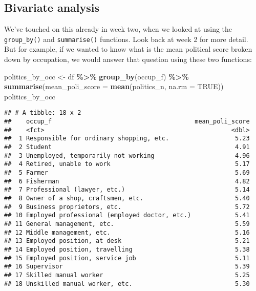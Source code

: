 \documentclass[
]{book}
\newenvironment{Shaded}{\begin{snugshade}}{\end{snugshade}}
\newcommand{\AttributeTok}[1]{\textcolor[rgb]{0.13,0.29,0.53}{#1}}
\newcommand{\ConstantTok}[1]{\textcolor[rgb]{0.56,0.35,0.01}{#1}}
\newcommand{\FunctionTok}[1]{\textcolor[rgb]{0.13,0.29,0.53}{\textbf{#1}}}
\newcommand{\NormalTok}[1]{#1}
\newcommand{\OtherTok}[1]{\textcolor[rgb]{0.56,0.35,0.01}{#1}}
\newcommand{\SpecialCharTok}[1]{\textcolor[rgb]{0.81,0.36,0.00}{\textbf{#1}}}
\begin{document}
\subsection{Bivariate analysis}\label{bivariate-analysis}

We've touched on this already in week two, when we looked at using the \texttt{group\_by()} and \texttt{summarise()} functions. Look back at week 2 for more detail. But for example, if we wanted to know what is the mean political score broken down by occupation, we would answer that question using these two functions:

\begin{Shaded}
\begin{Highlighting}[]
\NormalTok{politics\_by\_occ }\OtherTok{\textless{}{-}}\NormalTok{ df }\SpecialCharTok{\%\textgreater{}\%} 
    \FunctionTok{group\_by}\NormalTok{(occup\_f) }\SpecialCharTok{\%\textgreater{}\%} 
    \FunctionTok{summarise}\NormalTok{(}\AttributeTok{mean\_poli\_score =} \FunctionTok{mean}\NormalTok{(politics\_n, }\AttributeTok{na.rm =} \ConstantTok{TRUE}\NormalTok{))}
\NormalTok{politics\_by\_occ}
\end{Highlighting}
\end{Shaded}

\begin{verbatim}
## # A tibble: 18 x 2
##    occup_f                                       mean_poli_score
##    <fct>                                                   <dbl>
##  1 Responsible for ordinary shopping, etc.                  5.23
##  2 Student                                                  4.91
##  3 Unemployed, temporarily not working                      4.96
##  4 Retired, unable to work                                  5.17
##  5 Farmer                                                   5.69
##  6 Fisherman                                                4.82
##  7 Professional (lawyer, etc.)                              5.14
##  8 Owner of a shop, craftsmen, etc.                         5.40
##  9 Business proprietors, etc.                               5.72
## 10 Employed professional (employed doctor, etc.)            5.41
## 11 General management, etc.                                 5.59
## 12 Middle management, etc.                                  5.16
## 13 Employed position, at desk                               5.21
## 14 Employed position, travelling                            5.38
## 15 Employed position, service job                           5.11
## 16 Supervisor                                               5.39
## 17 Skilled manual worker                                    5.25
## 18 Unskilled manual worker, etc.                            5.30
\end{verbatim}
\end{document}
